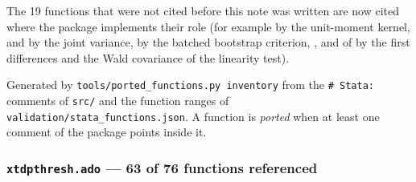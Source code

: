 \documentclass[
  10.5pt,
  a4paper,
]{article}
\begin{document}
\noindent The 19 functions that were not cited before this note was written are now cited where the package implements their role
(for example  by the unit-moment kernel,  and
 by the joint variance,  by the batched bootstrap criterion,
,  and  of  by the first differences and the Wald
covariance of the linearity test).

Generated by \texttt{tools/ported\_functions.py\ inventory} from the
\texttt{\#\ Stata:} comments of \texttt{src/} and the function ranges of
\texttt{validation/stata\_functions.json}. A function is \emph{ported}
when at least one comment of the package points inside it.

\subsubsection{\texorpdfstring{\texttt{xtdpthresh.ado} --- 63 of 76
functions
referenced}{xtdpthresh.ado --- 63 of 76 functions referenced}}\label{xtdpthresh.ado-63-of-76-functions-referenced}
\end{document}
